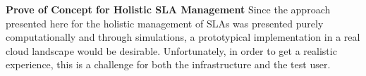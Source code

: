 \textbf{Prove of Concept for Holistic SLA Management }
Since the approach presented here for the holistic management of SLAs was presented purely computationally and through simulations, a prototypical implementation in a real cloud landscape would be desirable. Unfortunately, in order to get a realistic experience, this is a challenge for both the infrastructure and the test user.

